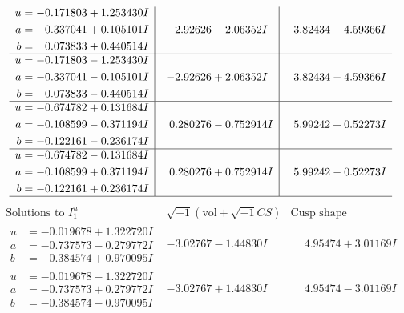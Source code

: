 \documentclass[1p]{elsarticle_modified}
\theoremstyle{definition}
\newcommand{\I}{\sqrt{-1}}
\begin{document}
$$\begin{array}{c|c|c}
\begin{aligned}
u &= -0.171803 + 1.253430 I \\
a &= -0.337041 + 0.105101 I \\
b &= \phantom{-}0.073833 + 0.440514 I\end{aligned}
 & -2.92626 - 2.06352 I & \phantom{-}3.82434 + 4.59366 I \\ \hline\begin{aligned}
u &= -0.171803 - 1.253430 I \\
a &= -0.337041 - 0.105101 I \\
b &= \phantom{-}0.073833 - 0.440514 I\end{aligned}
 & -2.92626 + 2.06352 I & \phantom{-}3.82434 - 4.59366 I \\ \hline\begin{aligned}
u &= -0.674782 + 0.131684 I \\
a &= -0.108599 - 0.371194 I \\
b &= -0.122161 - 0.236174 I\end{aligned}
 & \phantom{-}0.280276 - 0.752914 I & \phantom{-}5.99242 + 0.52273 I \\ \hline\begin{aligned}
u &= -0.674782 - 0.131684 I \\
a &= -0.108599 + 0.371194 I \\
b &= -0.122161 + 0.236174 I\end{aligned}
 & \phantom{-}0.280276 + 0.752914 I & \phantom{-}5.99242 - 0.52273 I\\
 \hline 
 \end{array}$$\newpage$$\begin{array}{c|c|c}  
\text{Solutions to }I^u_{1}& \I (\text{vol} + \sqrt{-1}CS) & \text{Cusp shape}\\
 \hline 
\begin{aligned}
u &= -0.019678 + 1.322720 I \\
a &= -0.737573 - 0.279772 I \\
b &= -0.384574 + 0.970095 I\end{aligned}
 & -3.02767 - 1.44830 I & \phantom{-}4.95474 + 3.01169 I \\ \hline\begin{aligned}
u &= -0.019678 - 1.322720 I \\
a &= -0.737573 + 0.279772 I \\
b &= -0.384574 - 0.970095 I\end{aligned}
 & -3.02767 + 1.44830 I & \phantom{-}4.95474 - 3.01169 I \\ \hline\begin{aligned}

\end{aligned}
\end{array}$$
\end{document}
